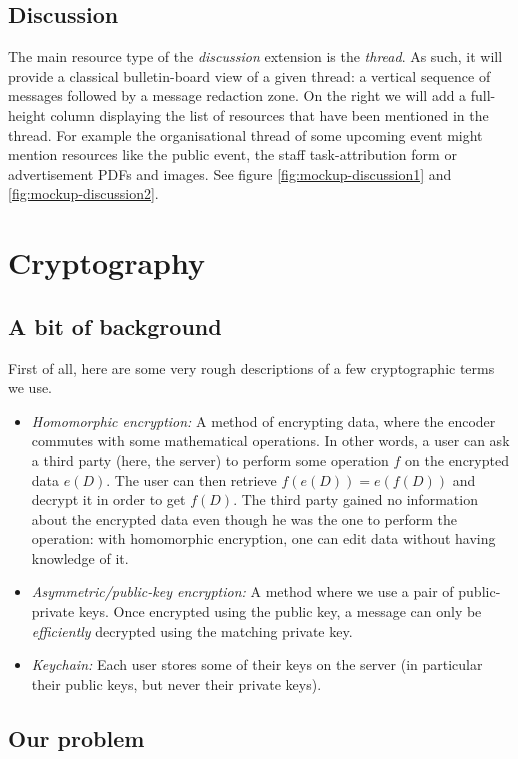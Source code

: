 \documentclass[a4paper, english]{report}
\begin{document}
\subsection{Discussion}
The main resource type of the \emph{discussion} extension is the \emph{thread}. As such, it will provide a classical bulletin-board view of a given thread: a vertical sequence of messages followed by a message redaction zone. On the right we will add a full-height column displaying the list of resources that have been mentioned in the thread. For example the organisational thread of some upcoming event might mention resources like the public event, the staff task-attribution form or advertisement PDFs and images. See figure \ref{fig:mockup-discussion1} and \ref{fig:mockup-discussion2}.


\afterpage{\clearpage}
\newpage

\section{Cryptography}

\subsection{A bit of background}

First of all, here are some very rough descriptions of a few cryptographic terms we use.
\begin{itemize}
\item \emph{Homomorphic encryption:} A method of encrypting data, where the encoder commutes with some mathematical operations. In other words, a user can ask a third party (here, the server) to perform some operation $f$ on the encrypted data $e(D)$. The user can then retrieve $f(e(D))=e(f(D))$ and decrypt it in order to get $f(D)$. The third party gained no information about the encrypted data even though he was the one to perform the operation: with homomorphic encryption, one can edit data without having knowledge of it.
\item \emph{Asymmetric/public-key encryption:} A method where we use a pair of public-private keys. Once encrypted using the public key, a message can only be \emph{efficiently} decrypted using the matching private key.
\item \emph{Keychain:} Each user stores some of their keys on the server (in particular their public keys, but never their private keys).
\end{itemize}

\subsection{Our problem}
\end{document}
